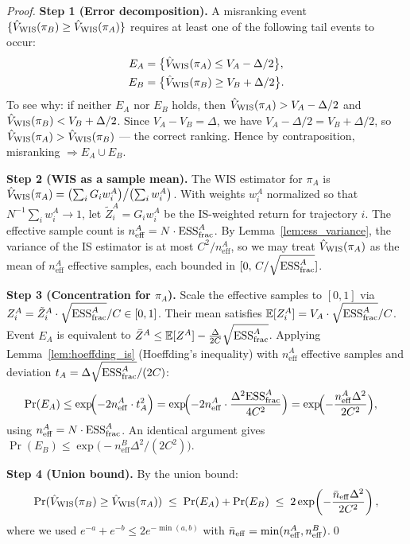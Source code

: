 \documentclass[10pt]{article}
\theoremstyle{plain}
\theoremstyle{definition}
\theoremstyle{remark}
\newcommand{\E}{\mathbb{E}}
\newcommand{\ESS}{\mathrm{ESS}}
\newcommand{\neff}{n_{\mathrm{eff}}}
\newcommand{\piA}{\pi_A}
\newcommand{\piB}{\pi_B}
\begin{document}
\begin{proof}
\textbf{Step 1 (Error decomposition).}
A misranking event $\{\hat{V}_{\rm WIS}(\piB)\geq\hat{V}_{\rm WIS}(\piA)\}$
requires at least one of the following tail events to occur:
\begin{align}
  E_A &= \bigl\{\hat{V}_{\rm WIS}(\piA) \leq V_A - \Delta/2\bigr\},\\
  E_B &= \bigl\{\hat{V}_{\rm WIS}(\piB) \geq V_B + \Delta/2\bigr\}.
\end{align}
To see why: if neither $E_A$ nor $E_B$ holds, then
$\hat{V}_{\rm WIS}(\piA) > V_A-\Delta/2$ and
$\hat{V}_{\rm WIS}(\piB) < V_B+\Delta/2$.
Since $V_A-V_B=\Delta$, we have $V_A-\Delta/2=V_B+\Delta/2$, so
$\hat{V}_{\rm WIS}(\piA) > \hat{V}_{\rm WIS}(\piB)$ --- the correct ranking.
Hence by contraposition, misranking $\Rightarrow E_A\cup E_B$.

\textbf{Step 2 (WIS as a sample mean).}
The WIS estimator for $\piA$ is
$\hat{V}_{\rm WIS}(\piA)=\bigl(\sum_i G_i w_i^A\bigr)\big/\bigl(\sum_i w_i^A\bigr)$.
With weights $w_i^A$ normalized so that $N^{-1}\sum_i w_i^A\to 1$,
let $\tilde{Z}_i^A = G_i w_i^A$ be the IS-weighted return for trajectory $i$.
The effective sample count is $\neff^A=N\cdot\ESS_{\rm frac}^A$.  By
Lemma~\ref{lem:ess_variance}, the variance of the IS estimator is at most
$C^2/\neff^A$, so we may treat $\hat{V}_{\rm WIS}(\piA)$ as the mean of
$\neff^A$ effective samples, each bounded in $[0,\, C/\sqrt{\ESS_{\rm frac}^A}]$.

\textbf{Step 3 (Concentration for $\piA$).}
Scale the effective samples to $[0,1]$ via
$Z_i^A = \tilde{Z}_i^A\cdot\sqrt{\ESS_{\rm frac}^A}/C\in[0,1]$.
Their mean satisfies $\E[Z_i^A]=V_A\cdot\sqrt{\ESS_{\rm frac}^A}/C$.
Event $E_A$ is equivalent to $\bar{Z}^A\leq\E[Z^A]-\frac{\Delta}{2C}\sqrt{\ESS_{\rm frac}^A}$.
Applying Lemma~\ref{lem:hoeffding_is} (Hoeffding's inequality) with
$\neff^A$ effective samples and deviation $t_A=\Delta\sqrt{\ESS_{\rm frac}^A}/(2C)$:
\begin{align}
  \Pr(E_A)
  &\leq \exp\!\Bigl(-2\neff^A\cdot t_A^2\Bigr)
   = \exp\!\Bigl(-2\neff^A\cdot\frac{\Delta^2\ESS_{\rm frac}^A}{4C^2}\Bigr)
   = \exp\!\Bigl(-\frac{\neff^A\Delta^2}{2C^2}\Bigr),
\end{align}
using $\neff^A=N\cdot\ESS_{\rm frac}^A$.  An identical argument gives
$\Pr(E_B)\leq\exp\!\bigl(-\neff^B\Delta^2/(2C^2)\bigr)$.

\textbf{Step 4 (Union bound).}
By the union bound:
\[
  \Pr(\hat{V}_{\rm WIS}(\piB)\geq\hat{V}_{\rm WIS}(\piA))
  \;\leq\; \Pr(E_A)+\Pr(E_B)
  \;\leq\; 2\exp\!\left(-\frac{\bar{n}_{\rm eff}\Delta^2}{2C^2}\right),
\]
where we used $e^{-a}+e^{-b}\leq 2e^{-\min(a,b)}$ with
$\bar{n}_{\rm eff}=\min(\neff^A,\neff^B)$.\qed
\end{proof}
\end{document}

